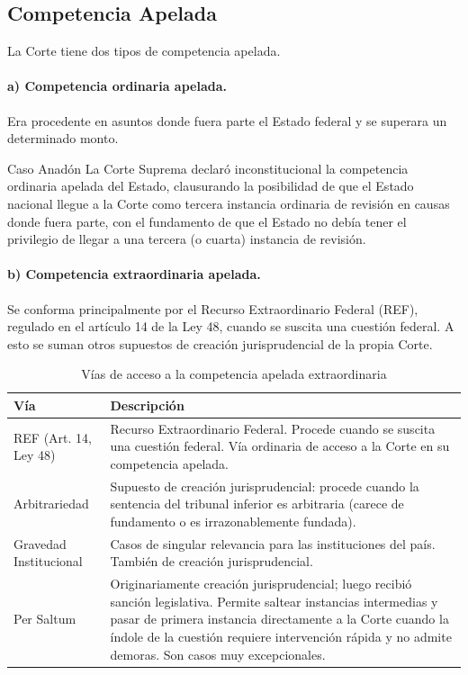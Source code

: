 \documentclass[12pt,oneside]{book}
\begin{document}
\subsection{Competencia Apelada}

La Corte tiene dos tipos de competencia apelada.

\paragraph{a) Competencia ordinaria apelada.} Era procedente en asuntos donde fuera parte el Estado federal y se superara un determinado monto.

\begin{example}{Caso Anadón}
La Corte Suprema declaró inconstitucional la competencia ordinaria apelada del Estado, clausurando la posibilidad de que el Estado nacional llegue a la Corte como tercera instancia ordinaria de revisión en causas donde fuera parte, con el fundamento de que el Estado no debía tener el privilegio de llegar a una tercera (o cuarta) instancia de revisión.
\end{example}

\paragraph{b) Competencia extraordinaria apelada.} Se conforma principalmente por el Recurso Extraordinario Federal (REF), regulado en el artículo 14 de la Ley 48, cuando se suscita una cuestión federal. A esto se suman otros supuestos de creación jurisprudencial de la propia Corte.

\begin{table}[H]
\centering
\caption{Vías de acceso a la competencia apelada extraordinaria}
\begin{tabularx}{\textwidth}{>{\raggedright\arraybackslash}p{} X}
\toprule
\textbf{Vía} & \textbf{Descripción} \\
\midrule
REF (Art. 14, Ley 48) & Recurso Extraordinario Federal. Procede cuando se suscita una cuestión federal. Vía ordinaria de acceso a la Corte en su competencia apelada. \\
Arbitrariedad & Supuesto de creación jurisprudencial: procede cuando la sentencia del tribunal inferior es arbitraria (carece de fundamento o es irrazonablemente fundada). \\
Gravedad Institucional & Casos de singular relevancia para las instituciones del país. También de creación jurisprudencial. \\
Per Saltum & Originariamente creación jurisprudencial; luego recibió sanción legislativa. Permite saltear instancias intermedias y pasar de primera instancia directamente a la Corte cuando la índole de la cuestión requiere intervención rápida y no admite demoras. Son casos muy excepcionales. \\
\bottomrule
\end{tabularx}
\end{table}
\end{document}
